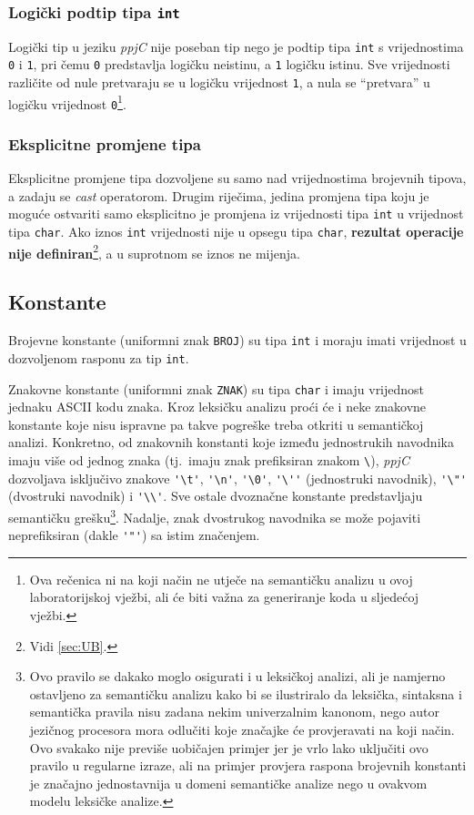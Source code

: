 \documentclass[times, 12pt, utf8]{book}
\begin{document}
\subsubsection{Logički podtip tipa \texttt{int}}
Logički tip u jeziku \emph{ppjC} nije poseban tip nego je podtip tipa \verb|int| s vrijednostima \verb|0| i \verb|1|, pri čemu \verb|0| predstavlja logičku neistinu, a \verb|1| logičku istinu.
Sve vrijednosti različite od nule pretvaraju se u logičku vrijednost \verb|1|, a nula se ``pretvara'' u logičku vrijednost \verb|0|\footnote{Ova rečenica ni na koji način ne utječe na semantičku analizu u ovoj laboratorijskoj vježbi, ali će biti važna za generiranje koda u sljedećoj vježbi.}.

\subsubsection{Eksplicitne promjene tipa}\label{sec:semantika_cast}
Eksplicitne promjene tipa dozvoljene su samo nad vrijednostima brojevnih tipova, a zadaju se \emph{cast} operatorom.
Drugim riječima, jedina promjena tipa koju je moguće ostvariti samo eksplicitno je promjena iz vrijednosti tipa \verb|int| u vrijednost tipa \verb|char|.
Ako iznos \verb|int| vrijednosti nije u opsegu tipa \verb|char|, \textbf{rezultat operacije nije definiran}\footnote{Vidi \ref{sec:UB}.}, a u suprotnom se iznos ne mijenja.

\subsection{Konstante}\label{sec:semantika_konstante}
Brojevne konstante (uniformni znak \verb|BROJ|) su tipa \verb|int| i moraju imati vrijednost u dozvoljenom rasponu za tip \verb|int|.

Znakovne konstante (uniformni znak \verb|ZNAK|) su tipa \verb|char| i imaju vrijednost jednaku ASCII kodu znaka.
Kroz leksičku analizu proći će i neke znakovne konstante koje nisu ispravne pa takve pogreške treba otkriti u semantičkoj analizi.
Konkretno, od znakovnih konstanti koje između jednostrukih navodnika imaju više od jednog znaka (tj.~imaju znak prefiksiran znakom \verb|\|), \emph{ppjC} dozvoljava isključivo znakove \verb|'\t'|, \verb|'\n'|, \verb|'\0'|, \verb|'\''| (jednostruki navodnik), \verb|'\"'| (dvostruki navodnik) i \verb|'\\'|.
Sve ostale dvoznačne konstante predstavljaju semantičku grešku\footnote{Ovo pravilo se dakako moglo osigurati i u leksičkoj analizi, ali je namjerno ostavljeno za semantičku analizu kako bi se ilustriralo da leksička, sintaksna i semantička pravila nisu zadana nekim univerzalnim kanonom, nego autor jezičnog procesora mora odlučiti koje značajke će provjeravati na koji način. Ovo svakako nije previše uobičajen primjer jer je vrlo lako uključiti ovo pravilo u regularne izraze, ali na primjer provjera raspona brojevnih konstanti je značajno jednostavnija u domeni semantičke analize nego u ovakvom modelu leksičke analize.}.
Nadalje, znak dvostrukog navodnika se može pojaviti neprefiksiran (dakle \verb|'"'|) sa istim značenjem.
\end{document}
